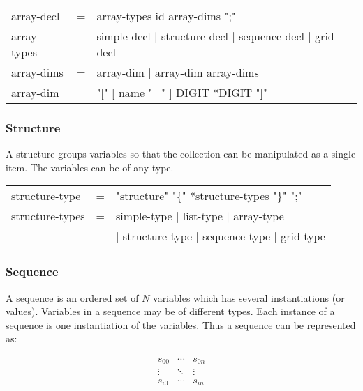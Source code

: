 \begin{ttfamily}
\begin{center}
\begin{tabular}{lll}
array-decl & = & array-types id array-dims ";" \\
array-types & = & simple-decl | structure-decl | sequence-decl | grid-decl \\
array-dims & = & array-dim | array-dim array-dims \\
array-dim & = & "[" [ name "=" ] DIGIT *DIGIT "]" \\
\end{tabular}
\end{center}
\end{ttfamily}

\subsubsection{Structure}
 A structure groups variables so that the collection can be
  manipulated as a single item. The variables can be of any type.

\begin{ttfamily}
\begin{center}
\begin{tabular}{lll}
structure-type & = & "structure" "\{" *structure-types "\}" ";" \\
structure-types & = & simple-type | list-type | array-type \\
                & & | structure-type | sequence-type | grid-type \\
\end{tabular}
\end{center}
\end{ttfamily}

\subsubsection{Sequence}
 A sequence is an ordered set of $N$ variables which has
  several instantiations (or values). Variables in a sequence may be of
  different types.  Each instance of a sequence is one instantiation of the
  variables. Thus a sequence can be represented as:

\begin{displaymath}
\begin{array}{ccc}
  s_{0 0} & \cdots & s_{0 n} \\
  \vdots & \ddots & \vdots \\
  s_{i 0} & \cdots & s_{i n}
\end{array}
\end{displaymath}

